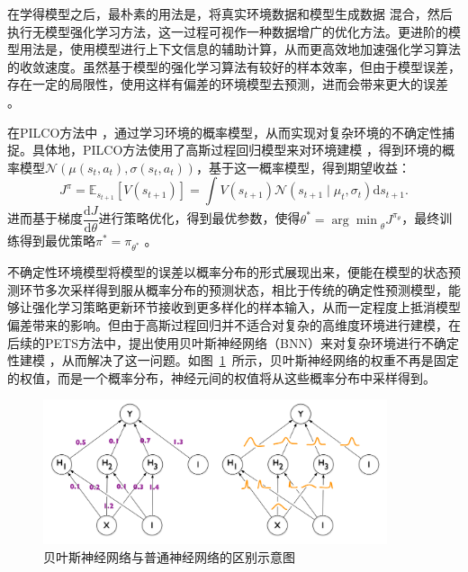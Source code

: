 在学得模型之后，最朴素的用法是，将真实环境数据和模型生成数据 混合，然后执行无模型强化学习方法，这一过程可视作一种数据增广的优化方法。更进阶的模型用法是，使用模型进行上下文信息的辅助计算，从而更高效地加速强化学习算法的收敛速度。虽然基于模型的强化学习算法有较好的样本效率，但由于模型误差，存在一定的局限性，使用这样有偏差的环境模型去预测，进而会带来更大的误差 \cite{zambaldi2018deep}。

在PILCO方法中 \cite{deisenroth2011pilco}，通过学习环境的概率模型，从而实现对复杂环境的不确定性捕捉。具体地，PILCO方法使用了高斯过程回归模型来对环境建模 \cite{quinonero2005unifying}，得到环境的概率模型$\mathcal{N}\left(\mu(s_t,a_t), \sigma(s_t,a_t)\right)$，基于这一概率模型，得到期望收益：
\begin{equation}
    J^\pi=\mathbb{E}_{s_{t+1}}\left[V\left(s_{t+1}\right)\right]=\int V\left(s_{t+1}\right) \mathcal{N}\left(s_{t+1} \mid \mu_t, \sigma_t\right) \mathrm{d} s_{t+1}.
\end{equation}
进而基于梯度$\dfrac{\mathrm{d}J}{\mathrm{d}\theta}$进行策略优化，得到最优参数，使得$\theta^* = {\arg\min}_\theta J^{\pi_\theta}$，最终训练得到最优策略$\pi^*=\pi_{\theta^*}$ 。\cite{peters2006policy}

不确定性环境模型将模型的误差以概率分布的形式展现出来，便能在模型的状态预测环节多次采样得到服从概率分布的预测状态，相比于传统的确定性预测模型，能够让强化学习策略更新环节接收到更多样化的样本输入，从而一定程度上抵消模型偏差带来的影响。但由于高斯过程回归并不适合对复杂的高维度环境进行建模，在后续的PETS方法\cite{Chua2018DeepModels}中，提出使用贝叶斯神经网络（BNN）来对复杂环境进行不确定性建模 \cite{Blundell2015WeightNetworks}，从而解决了这一问题。如图~\ref{fig:BNN}~所示，贝叶斯神经网络的权重不再是固定的权值，而是一个概率分布，神经元间的权值将从这些概率分布中采样得到。

\begin{figure}[tbh]
\centering
\includegraphics[width=0.9\textwidth]{figures/BNN.png}
\caption{贝叶斯神经网络与普通神经网络的区别示意图}
\label{fig:BNN}
\end{figure}

